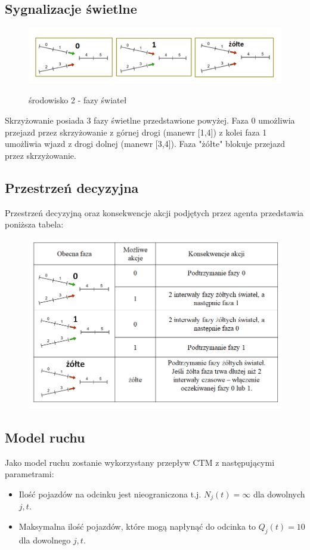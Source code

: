 \documentclass[12pt]{book}
\theoremstyle{plain}
\begin{document}
\subsection{Sygnalizacje świetlne}	
\begin{figure}[H]
	\centering
	\includegraphics[width=17cm]{images/env_14_fazy}
	\label{fig:env_14_fazy}
	\caption{środowisko 2 - fazy świateł}
\end{figure}\noindent
Skrzyżowanie posiada 3 fazy świetlne przedstawione powyżej. Faza 0 umożliwia przejazd przez skrzyżowanie z górnej drogi (manewr [1,4]) z kolei faza 1 umożliwia wjazd z drogi dolnej (manewr [3,4]). Faza "żółte" blokuje przejazd przez skrzyżowanie.

\subsection{Przestrzeń decyzyjna}
Przestrzeń decyzyjną oraz konsekwencje akcji podjętych przez agenta przedstawia poniższa tabela:
\begin{figure}[H]
	\centering
	\includegraphics[width=17cm]{images/env_14_akcje}
	\label{fig:env_14_akcje}
\end{figure} \noindent

\subsection{Model ruchu}
Jako model ruchu zostanie wykorzystany przepływ CTM z następującymi parametrami:
\begin{itemize}
	\item Ilość pojazdów na odcinku jest nieograniczona t.j. $N_j(t)=\infty$ dla dowolnych $j,t$.
	\item Maksymalna ilość pojazdów, które mogą napłynąć do odcinka to $Q_j(t)=10$ dla dowolnego $j,t$.
\end{itemize}
\end{document}
